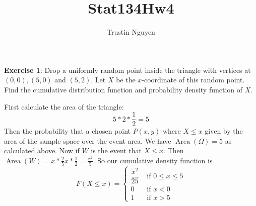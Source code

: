 \documentclass{article}
\title{Stat134Hw4}
\author{Trustin Nguyen}
\begin{document}
    \maketitle

\reversemarginpar

\textbf{Exercise 1}: Drop a uniformly random point inside the triangle with vertices at $(0, 0), (5, 0)$ and $(5, 2)$. Let $X$ be the $x$-coordinate of this random point. Find the cumulative distribution function and probability density function of $X$.
    \begin{answer}
        First calculate the area of the triangle:
            \begin{equation*}
                5 * 2 * \dfrac{1}{2} = 5
            \end{equation*}
        Then the probability that a chosen point $P(x, y)$ where $X \leq x$ given by the area of the sample space over the event area. We have $\mathop{Area}(\Omega) = 5$ as calculated above. Now if $W$ is the event that $X \leq x$. Then $\mathop{Area}(W) = x * \frac{2}{5}x * \frac{1}{2} = \frac{x^{2}}{5}$. So our cumulative density function is 
            \begin{equation*}
                F(X \leq x) = \begin{cases}
                    \dfrac{x^{2}}{25} &\text{ if } 0 \leq x \leq 5 \\
                    0 &\text{ if } x < 0 \\
                    1 &\text{ if } x > 5
                \end{cases}
            \end{equation*}
    \end{answer}
\end{document}

